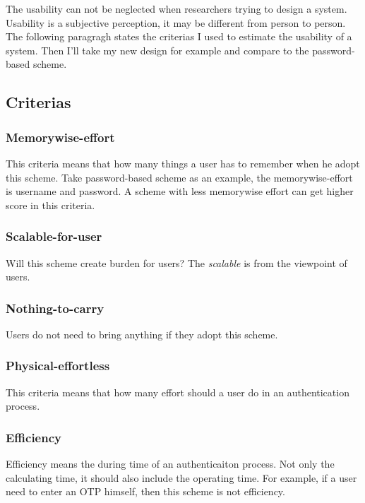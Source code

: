 \begin{CJK}{Bg5}{bsmi}
The usability can not be neglected when researchers trying to design a system.
Usability is a subjective perception, it may be different from person to person.
The following paragragh states the criterias I used to estimate the usability of a system. Then I'll take my new design for example and compare to the password-based scheme.

\subsection{Criterias}

\subsubsection{Memorywise-effort}

This criteria means that how many things a user has to remember when he adopt this scheme. Take password-based scheme as an example, the memorywise-effort is username and password. A scheme with less memorywise effort can get higher score in this criteria.

\subsubsection{Scalable-for-user}

Will this scheme create burden for users? The \emph{scalable} is from the viewpoint of users.

\subsubsection{Nothing-to-carry}

Users do not need to bring anything if they adopt this scheme.

\subsubsection{Physical-effortless}

This criteria means that how many effort should a user do in an authentication process.

\subsubsection{Efficiency}

Efficiency means the during time of an authenticaiton process. Not only the calculating time, it should also include the operating time. For example, if a user need to enter an OTP himself, then this scheme is not efficiency.


\end{CJK}
